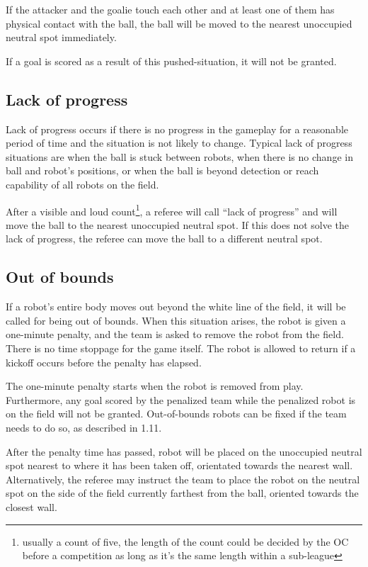 \documentclass{article}
\begin{document}
If the attacker and the goalie touch each other and at least one of them has
physical contact with the ball, the ball will be moved to the nearest
unoccupied neutral spot immediately.

If a goal is scored as a result of this pushed-situation, it will not be
granted.

\subsection{Lack of progress \label{ref-lack-of-progress}}

Lack of progress occurs if there is no progress in the gameplay for a
reasonable period of time and the situation is not likely to change. Typical
lack of progress situations are when the ball is stuck between robots, when
there is no change in ball and robot's positions, or when the ball is beyond
detection or reach capability of all robots on the field.

After a visible and loud count\footnote{usually a count of five, the length of
the count could be decided by the OC before a competition as long as it's
the same length within a sub-league}, a referee will call ``lack of
progress'' and will move the ball to the nearest unoccupied neutral spot. If
this does not solve the lack of progress, the referee can move the ball to a
different neutral spot.

\subsection{Out of bounds \label{ref-011}}

If a robot's entire body moves out beyond the white line of the field, it
will be called for being out of bounds. When this situation arises, the robot
is given a one-minute penalty, and the team is asked to remove the robot from
the field. There is no time stoppage for the game itself. The robot is allowed
to return if a kickoff occurs before the penalty has elapsed.

The one-minute penalty starts when the robot is removed from play. Furthermore,
any goal scored by the penalized team while the penalized robot is on the field
will not be granted. Out-of-bounds robots can be fixed if the team needs to do
so, as described in 1.11.

After the penalty time has passed, robot will be placed on the unoccupied
neutral spot nearest to where it has been taken off, orientated towards the
nearest wall.  Alternatively, the referee may instruct the team to place the
robot on the neutral spot on the side of the field currently farthest from the
ball, oriented towards the closest wall.
\end{document}
